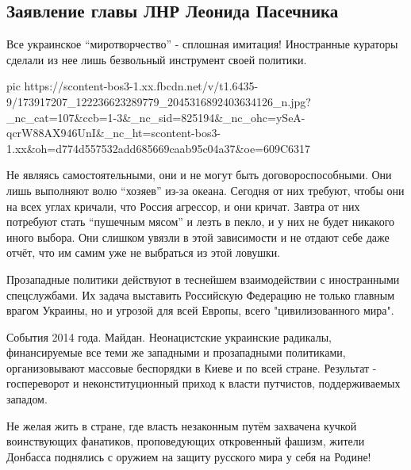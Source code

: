  
 
 
 
 

\subsection{Заявление главы ЛНР Леонида Пасечника}
\label{sec:14_04_2021.fb.respublikalnr.8.lnr_zajavlenie_mirotvorchestvo_imitacia_ukraina}

Все украинское \enquote{миротворчество} - сплошная имитация! Иностранные кураторы
сделали из нее лишь безвольный инструмент своей политики.  

\ifcmt
  pic https://scontent-bos3-1.xx.fbcdn.net/v/t1.6435-9/173917207_122236623289779_2045316892403634126_n.jpg?_nc_cat=107&ccb=1-3&_nc_sid=825194&_nc_ohc=ySeA-qcrW88AX946UnI&_nc_ht=scontent-bos3-1.xx&oh=d774d557532add685669caab95c04a37&oe=609C6317
\fi

Не являясь самостоятельными, они и не могут быть договороспособными. Они лишь выполняют
волю \enquote{хозяев} из-за океана. Сегодня от них требуют, чтобы они на всех углах
кричали, что Россия агрессор, и они кричат. Завтра от них потребуют стать
\enquote{пушечным мясом} и лезть в пекло, и у них не будет никакого иного выбора. Они
слишком увязли в этой зависимости и не отдают себе даже отчёт, что им самим уже
не выбраться из этой ловушки.

Прозападные политики действуют в теснейшем взаимодействии с иностранными
спецслужбами. Их задача выставить Российскую Федерацию не только главным врагом
Украины, но и угрозой для всей Европы, всего "цивилизованного мира".

События 2014 года. Майдан. Неонацистские украинские радикалы, финансируемые все
теми же западными и прозападными политиками, организовывают массовые беспорядки
в Киеве и по всей стране. Результат - госпереворот и неконституционный приход к
власти путчистов, поддерживаемых западом.

Не желая жить в стране, где власть незаконным путём захвачена кучкой
воинствующих фанатиков, проповедующих откровенный фашизм, жители Донбасса
поднялись с оружием на защиту русского мира у себя на Родине!

